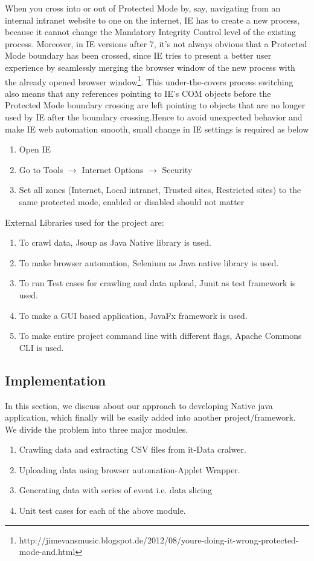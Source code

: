 \documentclass[article,type=msc,colorback,accentcolor=tud9c,twoside,11pt]{tudthesis}
\begin{document}
When you cross into or out of Protected Mode by, say, navigating from an internal intranet website to one on the internet, IE has to create a new process, because it cannot change the Mandatory Integrity Control level of the existing process. Moreover, in IE versions after 7, it's not always obvious that a Protected Mode boundary has been crossed, since IE tries to present a better user experience by seamlessly merging the browser window of the new process with the already opened browser window\footnote{http://jimevansmusic.blogspot.de/2012/08/youre-doing-it-wrong-protected-mode-and.html}. This under-the-covers process switching also means that any references pointing to IE's COM objects before the Protected Mode boundary crossing are left pointing to objects that are no longer used by IE after the boundary crossing.Hence to avoid unexpected behavior and make IE web automation smooth, small change in IE settings is required as below
\begin{enumerate}
\item Open IE
\item Go to Tools $\rightarrow$ {Internet Options} $\rightarrow$ {Security}
\item Set all zones (Internet, Local intranet, Trusted sites, Restricted sites) to the same protected mode, enabled or disabled should not matter
\end{enumerate}
External Libraries used for the project are:
\begin{enumerate}
\item To crawl data, Jsoup as Java Native library is used.
\item To make browser automation, Selenium as Java native library is used.
\item To run Test cases for crawling and data upload, Junit as test framework is used. 
\item To make a GUI based application, JavaFx framework is used.
\item To make entire project command line with different flags, Apache Commons CLI is used. 
\end{enumerate}

\subsection{Implementation}
In this section, we discuss about our approach to developing Native java application, which finally will be easily added into another project/framework. We divide the problem into three major modules.
\begin{enumerate}
	\item Crawling data and extracting CSV files from it-Data cralwer.
	\item Uploading data using browser automation-Applet Wrapper.
	\item Generating data with series of event i.e. data slicing
	\item Unit test cases for each of the above module.
	
\end{enumerate}
\end{document}
